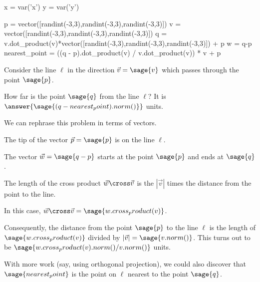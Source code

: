 \documentclass{ximera}
\author{Jim Fowler}
\begin{document}
\makerandom

\begin{sagesilent}
  x = var('x')
  y = var('y')
  
  p = vector([randint(-3,3),randint(-3,3),randint(-3,3)])
  v = vector([randint(-3,3),randint(-3,3),randint(-3,3)])
  q = v.dot_product(v)*vector([randint(-3,3),randint(-3,3),randint(-3,3)]) + p
  w = q-p
  nearest_point = ((q - p).dot_product(v) / v.dot_product(v)) * v + p
\end{sagesilent}

\begin{exercise}
  Consider the line $\ell$ in the direction $\vec{v} = \sage{v}$ which passes through the point $\sage{p}$.
  
  How far is the point \(\sage{q}\) from the line \(\ell\)?  It is
  \(\answer{\sage{(q - nearest_point).norm()}}\) units.

  \begin{hint}
    We can rephrase this problem in terms of vectors.
  \end{hint}

  \begin{hint}
    The tip of the vector $\vec{p} = \sage{p}$ is on the line $\ell$.
  \end{hint}

  \begin{hint}
    The vector $\vec{w} = \sage{q-p}$ starts at the point $\sage{p}$ and ends at $\sage{q}$.
  \end{hint}

  \begin{hint}
    The length of the cross product $\vec{w} \cross \vec{v}$ is the $|\vec{v}|$ times the distance from the point to the line.
  \end{hint}

  \begin{hint}
    In this case, $\vec{w} \cross \vec{v} = \sage{w.cross_product(v)}$.
  \end{hint}

  \begin{hint}
    Consequently, the distance from the point $\sage{p}$ to the line $\ell$ is the length of $\sage{w.cross_product(v)}$ divided by $|\vec{v}| = \sage{v.norm()}$.  This turns out to be $\sage{w.cross_product(v).norm()/v.norm()}$ units.
  \end{hint}

  \begin{hint}
    With more work (say, using orthogonal projection), we could also discover that $\sage{nearest_point}$ is the point on $\ell$ nearest to the point $\sage{q}$.
  \end{hint}
  
\end{exercise}
\end{document}
